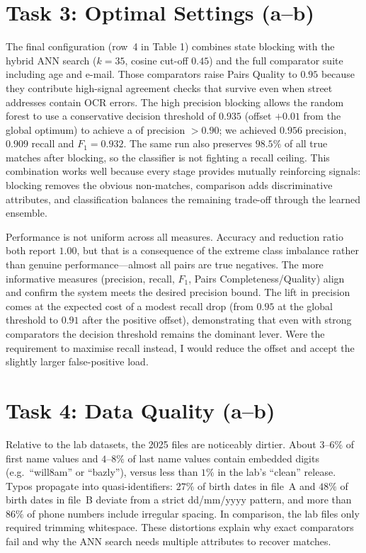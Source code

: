 \documentclass[11pt]{article}
\begin{document}
\section*{Task 3: Optimal Settings (a--b)}
The final configuration (row~4 in Table 1) combines state blocking with the hybrid ANN search ($k{=}35$, cosine cut-off $0.45$) and the full comparator suite including age and e-mail. Those comparators raise Pairs Quality to $0.95$ because they contribute high-signal agreement checks that survive even when street addresses contain OCR errors. The high precision blocking allows the random forest to use a conservative decision threshold of $0.935$ (offset $+0.01$ from the global optimum) to achieve a of precision $>0.90$; we achieved $0.956$ precision, $0.909$ recall and $F_{1} = 0.932$. The same run also preserves $98.5\%$ of all true matches after blocking, so the classifier is not fighting a recall ceiling. This combination works well because every stage provides mutually reinforcing signals: blocking removes the obvious non-matches, comparison adds discriminative attributes, and classification balances the remaining trade-off through the learned ensemble.

Performance is not uniform across all measures. Accuracy and reduction ratio both report $1.00$, but that is a consequence of the extreme class imbalance rather than genuine performance---almost all pairs are true negatives. The more informative measures (precision, recall, $F_{1}$, Pairs Completeness/Quality) align and confirm the system meets the desired precision bound. The lift in precision comes at the expected cost of a modest recall drop (from $0.95$ at the global threshold to $0.91$ after the positive offset), demonstrating that even with strong comparators the decision threshold remains the dominant lever. Were the requirement to maximise recall instead, I would reduce the offset and accept the slightly larger false-positive load.

\section*{Task 4: Data Quality (a--b)}
Relative to the lab datasets, the 2025 files are noticeably dirtier. About $3$--$6\%$ of first name values and $4$--$8\%$ of last name values contain embedded digits (e.g.\ ``will8am'' or ``bazly''), versus less than $1\%$ in the lab's ``clean'' release. Typos propagate into quasi-identifiers: $27\%$ of birth dates in file~A and $48\%$ of birth dates in file~B deviate from a strict dd/mm/yyyy pattern, and more than $86\%$ of phone numbers include irregular spacing. In comparison, the lab files only required trimming whitespace. These distortions explain why exact comparators fail and why the ANN search needs multiple attributes to recover matches.
\end{document}

